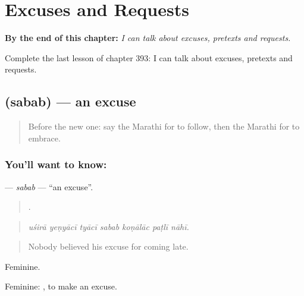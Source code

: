 
\chapter{Excuses and Requests}
\label{ch:mr-excuses-and-requests}

\begin{chapteropening}
\textbf{By the end of this chapter:} \emph{I can talk about excuses, pretexts and requests.}

Complete the last lesson of chapter 393: I can talk about excuses, pretexts and requests.
\end{chapteropening}

\section[\texorpdfstring{\mr{सबब} (sabab)}{सबब (sabab)}]{ (sabab) — an excuse}

\label{lesson:MR-C393-sabab}



\begin{quote}
Before the new one: say the Marathi for to follow, then the Marathi for to embrace.
\end{quote}

\subsection*{You'll want to know: }
\textbf{} — \emph{sabab} — \textquotedblleft{}an excuse\textquotedblright{}.

\begin{quote}
      .
\end{quote}

\begin{quote}
\emph{uśirā yeṇyācī tyācī sabab koṇālāc paṭlī nāhī.}
\end{quote}

\begin{quote}
Nobody believed his excuse for coming late.
\end{quote}

Feminine.

Feminine:  , to make an excuse.


